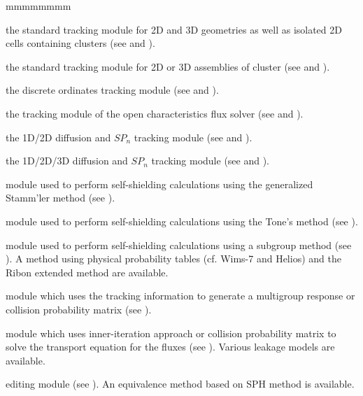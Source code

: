 \begin{ListeDeDescription}{mmmmmmmm}
\item[\moc{EXCELT:}] the standard tracking module for 2D and 3D geometries as well as isolated 2D 
cells containing clusters (see  and ).

\item[\moc{NXT:}] the standard tracking module for 2D or 3D assemblies of cluster (see
 and ).

\item[\moc{SNT:}] the discrete ordinates tracking module (see
 and ).

\item[\moc{MCCGT:}] the tracking module of the open characteristics flux
solver (see  and ).

\item[\moc{BIVACT:}] the 1D/2D diffusion and $SP_n$ tracking module (see
 and ).

\item[\moc{TRIVAT:}] the 1D/2D/3D diffusion and $SP_n$ tracking module (see
 and ).

\item[\moc{SHI:}] module used to perform self-shielding calculations
using the generalized Stamm'ler method (see ).

\item[\moc{TONE:}] module used to perform self-shielding calculations
using the Tone's method (see ).

\item[\moc{USS:}] module used to perform self-shielding calculations
using a subgroup method (see ). A method using physical
probability tables (cf. Wims-7 and Helios) and the Ribon extended method
are available.

\item[\moc{ASM:}] module which uses the tracking information to
generate a multigroup response or collision probability matrix (see
).

\item[\moc{FLU:}] module which uses inner-iteration approach or
collision probability matrix to solve the transport equation for the fluxes
(see ). Various leakage models are available.

\item[\moc{EDI:}] editing module (see ). An equivalence method based
on SPH method is available.


\end{ListeDeDescription}
